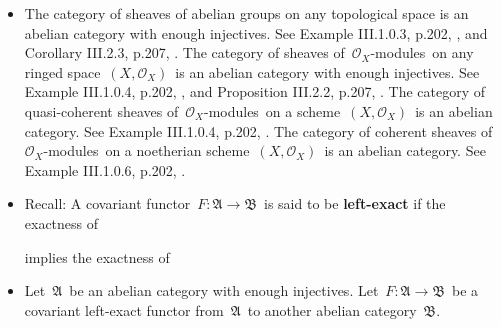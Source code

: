 \begin{itemize}
\item
	The category of sheaves of abelian groups on any topological space is an abelian category with enough injectives.
	See Example III.1.0.3, p.202, \cite{hartshorne1977algebraic}, and Corollary III.2.3, p.207, \cite{hartshorne1977algebraic}.
	\vskip 0.05cm
	The category of sheaves of \,$\mathcal{O}_{X}$-modules\, on any ringed space \,$(X,\mathcal{O}_{X})$\,
	is an abelian category with enough injectives.
	See Example III.1.0.4, p.202, \cite{hartshorne1977algebraic}, and Proposition III.2.2, p.207, \cite{hartshorne1977algebraic}.
	\vskip 0.05cm
	The category of quasi-coherent sheaves of \,$\mathcal{O}_{X}$-modules\,
	on a scheme \,$(X,\mathcal{O}_{X})$\, is an abelian category.
	See Example III.1.0.4, p.202, \cite{hartshorne1977algebraic}.
	\vskip 0.05cm
	The category of coherent sheaves of \,$\mathcal{O}_{X}$-modules\,
	on a noetherian scheme \,$(X,\mathcal{O}_{X})$\, is an abelian category.
	See Example III.1.0.6, p.202, \cite{hartshorne1977algebraic}.
	\vskip 0.3cm

\item
	Recall:\; A covariant functor \,$F : \mathfrak{A} \longrightarrow \mathfrak{B}$\,
	is said to be \textbf{left-exact} if the exactness of
	\begin{center}
	\end{center}
	implies the exactness of
	\begin{center}
	\end{center}
	\vskip 0.3cm

\item
	Let \,$\mathfrak{A}$\, be an abelian category with enough injectives.
	Let \,$F : \mathfrak{A} \longrightarrow \mathfrak{B}$\, be a covariant left-exact functor
	from \,$\mathfrak{A}$\, to another abelian category \,$\mathfrak{B}$.\,


\end{itemize}
